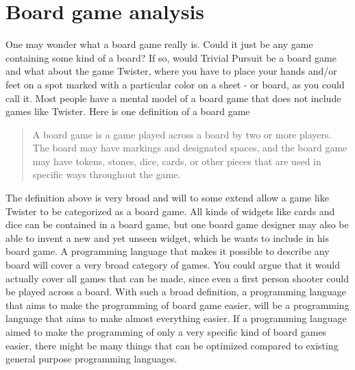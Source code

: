 \section{Board game analysis}
\label{sec:board-game-analysis}

One may wonder what a board game really is. 
Could it just be any game containing some kind of a board? 
If so, would Trivial Pursuit be a board game and what about the game Twister, where you have to place your hands and/or feet on a spot marked with a particular color on a sheet - or board, as you could call it.
Most people have a mental model of a board game that does not include games like Twister. Here is one definition of a board game

\begin{quote}
A board game is a game played across a board by two or more players. The board may have markings and designated spaces, and the board game may have tokens, stones, dice, cards, or other pieces that are used in specific ways throughout the game. \cite{def-board-game}
\end{quote}

The definition above is very broad and will to some extend allow a game like Twister to be categorized as a board game. 
All kinds of widgets like cards and dice can be contained in a board game, but one board game designer may also be able to invent a new and yet unseen widget, which he wants to include in his board game. 
A programming language that makes it possible to describe any board will cover a very broad category of games. 
You could argue that it would actually cover all games that can be made, since even a first person shooter could be played across a board.
With such a broad definition, a programming language that aims to make the programming of board game easier, will be a programming language that aims to make almost everything easier.
If a programming language aimed to make the programming of only a very specific kind of board games easier, there might be many things that can be optimized compared to existing general purpose programming languages.